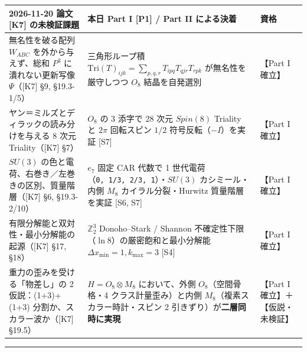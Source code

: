 \documentclass[
  a4paper,
]{ltjsarticle}
\newcounter{none} %
\begin{document}
{\def\LTcaptype{none} %
\begin{longtable}[]{@{}
  >{\raggedright\arraybackslash}p{}
  >{\raggedright\arraybackslash}p{}
  >{\raggedright\arraybackslash}p{}@{}}
\toprule\noalign{}
\begin{minipage}[b]{\linewidth}\raggedright
2026-11-20 論文 {[}K7{]} の未検証課題
\end{minipage} & \begin{minipage}[b]{\linewidth}\raggedright
本日 Part I {[}P1{]} / Part II による決着
\end{minipage} & \begin{minipage}[b]{\linewidth}\raggedright
資格
\end{minipage} \\
\midrule\noalign{}
\endhead
\bottomrule\noalign{}
\endlastfoot
無名性を破る配列 \(W_{ABC}\) を外から与えず、総和 \(P^3\)
に潰れない更新写像 \(\Psi\)（{[}K7{]} §9, §19.3-1/5） & 三角形ループ積
\(\mathrm{Tri}(T)_{ijk} = \sum_{p,q,r} T_{ipq} T_{qjr} T_{rpk}\)
が無名性を厳守しつつ \(O_8\) 結晶を自発選別 & 【Part I 確立】 \\
ヤン＝ミルズとディラックの読み分けを与える 8 次元 Triality（{[}K7{]}
§7） & \(O_8\) の 3 添字で 28 次元 \(Spin(8)\) Triality と \(2\pi\)
回転スピン \(1/2\) 符号反転（\(-I\)）を実証 {[}S7{]} & 【Part I
確立】 \\
\(SU(3)\) の色と電荷、右巻き／左巻きの区別、質量階層（{[}K7{]} §6,
§19.3-2/10） & \(e_7\) 固定 CAR 代数で 1
世代電荷（\texttt{0,\ 1/3,\ 2/3,\ 1}）・\(SU(3)\) カシミール・内側
\(M_8\) カイラル分裂・Hurwitz 質量階層を実証 {[}S6, S7{]} & 【Part I
確立】 \\
有限分解能と双対性・最小分解能の起源（{[}K7{]} §17, §18） &
\(\mathbb{Z}_2^3\) Donoho--Stark / Shannon
不確定性下限（\(\ln 8\)）の厳密飽和と最小分解能
\(\Delta x_{\min}=1, k_{\max}=3\) {[}S4{]} & 【Part I 確立】 \\
重力の歪みを受ける「物差し」の 2 仮説：(1+3)+(1+3)
分割か、スカラー波か（{[}K7{]} §19.5） & \(H = O_8 \otimes M_8\)
において、外側 \(O_8\)（空間骨格・4 クラス計量歪み）と内側
\(M_8\)（複素スカラー時計・スピン 2 引きずり）が\textbf{二層同時に実現}
& 【Part I 確立】＋【仮説・未検証】 \\
\end{longtable}
}

\begin{center}\rule{0.5\linewidth}{0.5pt}\end{center}
\end{document}
